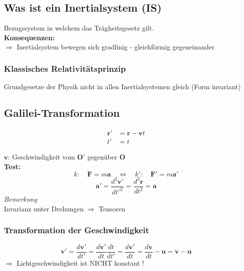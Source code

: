 \documentclass[titlepage,11pt,a4paper,ngerman]{report}
\renewcommand{\vec}[1]{\boldsymbol{#1}}
\newcommand{\frbox}[2]{\begin{tcolorbox}[colback=white,colframe=red!75!black,fonttitle=\bfseries,title=#1]#2\end{tcolorbox}}
\begin{document}
\subsection{Was ist ein Inertialsystem (IS)}
Bezugssystem in welchem das Trägheitsgesetz gilt.\\[10pt]
\textbf{Konsequenzen:}\\[5pt]
$\Rightarrow$ Inertialsystem bewegen sich gradlinig - gleichförmig gegeneinander

\subsubsection{Klassisches Relativitätsprinzip}
Grundgesetze der Physik nicht in allen Inertialsystemen gleich (Form invariant)

\subsection{Galilei-Transformation}
\frbox{Galilei-Trafo}{\begin{align*}
\vec r' &= \vec{r} - \vec{v} t \\
t' &= t
\end{align*}}
$ \vec{v} $: Geschwindigkeit vom $ \vec{O}' $ gegenüber $ \vec{O} $\\[5pt]
\textbf{Test:}
\begin{equation*}
k: \quad \vec{F} = m \vec{a} \quad \Leftrightarrow \quad k': \quad \vec{F}' = m \vec{a}'
\end{equation*}
\begin{equation*}
\vec{a}' = \frac{d^2 \vec{v}'}{dt'^2} = \frac{d^2 \vec{r}}{dt^2} = \vec{a}
\end{equation*}
\emph{Bemerkung}\\
Invarianz unter Drehungen $ \Rightarrow $ Tensoren

\subsubsection{Transformation der Geschwindigkeit}
\begin{equation*}
\vec{v}' = \frac{d\vec{v}'}{dt'} = \frac{d\vec{v}'}{dt} \frac{dt}{dt'} = \frac{d\vec{v}'}{dt} = \frac{d\vec{v}}{dt} - \vec{u} = \vec{v} - \vec{u}
\end{equation*}
$ \Rightarrow $ Lichtgeschwindigkeit ist NICHT konstant ! %
\end{document}
